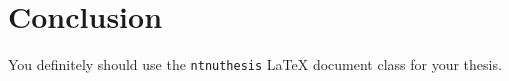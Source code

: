 \chapter{Conclusion}
\label{chap:Conclusion}

You definitely should use the \texttt{ntnuthesis} \LaTeX{} document class for your thesis.
